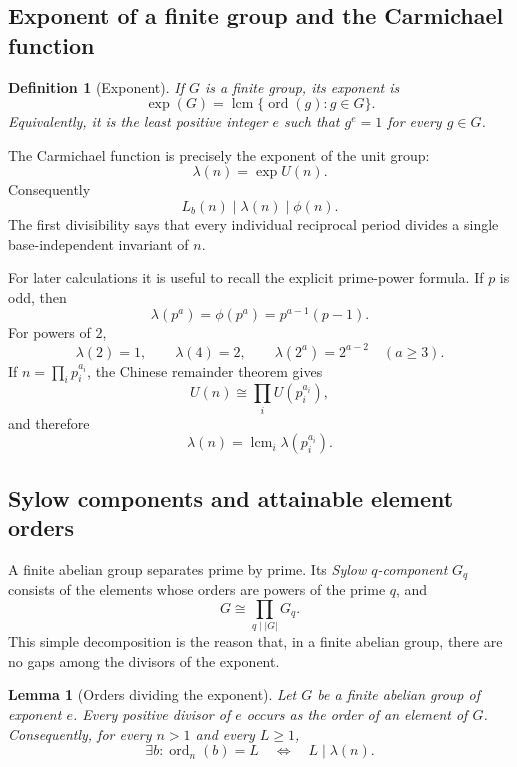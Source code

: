 \documentclass[11pt]{article}
\newtheorem{lemma}[theorem]{Lemma}
\newtheorem{definition}[theorem]{Definition}
\newcommand{\ord}{\operatorname{ord}}
\begin{document}
\subsection{Exponent of a finite group and the Carmichael function}

\begin{definition}[Exponent]
If $G$ is a finite group, its \emph{exponent} is
\[
\exp(G)=\operatorname{lcm}\{\ord(g):g\in G\}.
\]
Equivalently, it is the least positive integer $e$ such that $g^e=1$ for every
$g\in G$.
\end{definition}

The Carmichael function is precisely the exponent of the unit group:
\[
\boxed{\lambda(n)=\exp U(n).}
\]
Consequently
\begin{equation}
L_b(n)\mid\lambda(n)\mid\phi(n).
\label{eq:ord-chain}
\end{equation}
The first divisibility says that every individual reciprocal period divides a
single base-independent invariant of $n$.

For later calculations it is useful to recall the explicit prime-power
formula.  If $p$ is odd, then
\[
\lambda(p^a)=\phi(p^a)=p^{a-1}(p-1).
\]
For powers of $2$,
\[
\lambda(2)=1,\qquad \lambda(4)=2,\qquad
\lambda(2^a)=2^{a-2}\quad(a\ge3).
\]
If $n=\prod_i p_i^{a_i}$, the Chinese remainder theorem gives
\[
U(n)\cong\prod_i U(p_i^{a_i}),
\]
and therefore
\[
\lambda(n)=\operatorname{lcm}_i\lambda(p_i^{a_i}).
\]

\subsection{Sylow components and attainable element orders}

A finite abelian group separates prime by prime.  Its \emph{Sylow
$q$-component} $G_q$ consists of the elements whose orders are powers of the
prime $q$, and
\[
G\cong\prod_{q\mid |G|}G_q.
\]
This simple decomposition is the reason that, in a finite abelian group,
there are no gaps among the divisors of the exponent.

\begin{lemma}[Orders dividing the exponent]
\label{lem:divisor-exponent}
Let $G$ be a finite abelian group of exponent $e$.  Every positive divisor of
$e$ occurs as the order of an element of $G$.
Consequently, for every $n>1$ and every $L\ge1$,
\[
\exists b:\ord_n(b)=L
\quad\Longleftrightarrow\quad
L\mid\lambda(n).
\]
\end{lemma}
\end{document}
